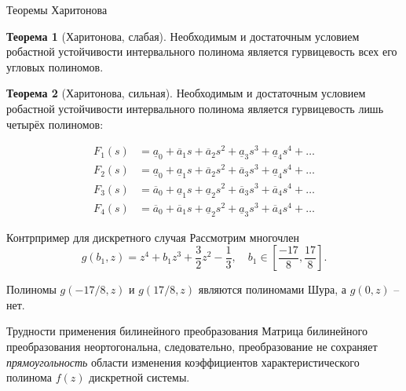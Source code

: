 \documentclass[notheorems,aspectratio=169]{beamer}
\theoremstyle{definition}
\newtheorem{theorem}{Теорема}
\begin{document}
\begin{frame}{Теоремы Харитонова}
  \begin{theorem}[Харитонова, слабая]
    Необходимым и достаточным условием робастной устойчивости интервального
    полинома является гурвицевость всех его угловых полиномов.
  \end{theorem}

  \begin{theorem}[Харитонова, сильная]
    Необходимым и достаточным условием робастной устойчивости интервального
    полинома является гурвицевость лишь четырёх полиномов:

    \begin{equation}
      \begin{aligned}
        F_1(s) &= \underline{a}_0 + \overline{a}_1 s + \overline{a}_2 s^2 +
        \underline{a}_3 s^3 + \underline{a}_4 s^4 + \dots \\
        F_2(s) &= \underline{a}_0 + \underline{a}_1 s + \overline{a}_2 s^2 +
        \overline{a}_3 s^3 + \underline{a}_4 s^4 + \dots \\
        F_3(s) &= \overline{a}_0 + \underline{a}_1 s + \underline{a}_2 s^2 +
        \overline{a}_3 s^3 + \overline{a}_4 s^4 + \dots \\
        F_4(s) &= \overline{a}_0 + \overline{a}_1 s + \underline{a}_2 s^2 +
        \underline{a}_3 s^3 + \overline{a}_4 s^4 + \dots
      \end{aligned}
    \end{equation}
  \end{theorem}
\end{frame}

\begin{frame}{Контрпример для дискретного случая}
  Рассмотрим многочлен
  \begin{equation}
    g(b_1, z) = z^4 + b_1z^3 + \frac{3}{2} z^2 - \frac{1}{3}, \quad b_1 \in \left[\frac{-17}{8}, \frac{17}{8}\right].
  \end{equation}

  Полиномы $g(-17/8, z)$ и $g(17/8, z)$ являются полиномами Шура, а $g(0, z)$ -- нет.
\end{frame}

\begin{frame}{Трудности применения билинейного преобразования}
  Матрица билинейного преобразования неортогональна, следовательно, преобразование
  не сохраняет \textit{прямоугольность} области изменения коэффициентов характеристического полинома $f(z)$ дискретной системы.
\end{frame}
\end{document}
